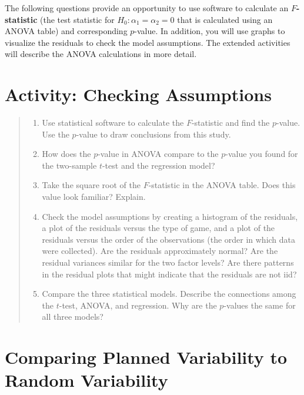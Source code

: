 \documentclass[
]{report}
\providecommand{\tightlist}{%
  \setlength{\itemsep}{0pt}\setlength{\parskip}{0pt}}
\begin{document}
The following questions provide an opportunity to use software to calculate an \textbf{\(F\)-statistic} (the test statistic for \(H_0: \alpha_1 = \alpha_2 = 0\) that is calculated using an ANOVA table) and corresponding \(p\)-value. In addition, you will use graphs to visualize the residuals to check the model assumptions. The extended activities will describe the ANOVA calculations in more detail.

\section*{Activity: Checking Assumptions}\label{activity-checking-assumptions}

\begin{quote}
\begin{enumerate}
\def\labelenumi{\arabic{enumi}.}
\setcounter{enumi}{22}
\tightlist
\item
  Use statistical software to calculate the \(F\)-statistic and find the \(p\)-value. Use the \(p\)-value to draw conclusions from this study.
\item
  How does the \(p\)-value in ANOVA compare to the \(p\)-value you found for the two-sample \(t\)-test and the regression model?
\item
  Take the square root of the \(F\)-statistic in the ANOVA table. Does this value look familiar? Explain.
\item
  Check the model assumptions by creating a histogram of the residuals, a plot of the residuals versus the type of game, and a plot of the residuals versus the order of the observations (the order in which data were collected). Are the residuals approximately normal? Are the residual variances similar for the two factor levels? Are there patterns in the residual plots that might indicate that the residuals are not iid?
\item
  Compare the three statistical models. Describe the connections among the \(t\)-test, ANOVA, and regression. Why are the \(p\)-values the same for all three models?
\end{enumerate}
\end{quote}

\section{\texorpdfstring{\textbf{Comparing Planned Variability to Random Variability}}{Comparing Planned Variability to Random Variability}}\label{comparing-planned-variability-to-random-variability}
\end{document}
